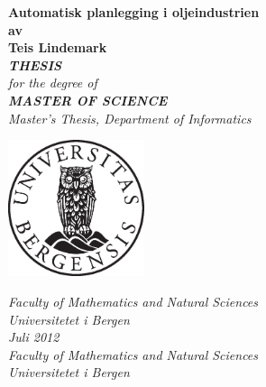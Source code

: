 \documentclass[12pt,twoside,onecolumn]{article}
\begin{document}
\thispagestyle{empty}
\begin{center}        %
  \vspace{5mm}          %
  \LARGE
  \textbf{Automatisk planlegging i oljeindustrien} \\
  \Large
  \vspace{5mm}
  \textbf{av} \\
  \vspace{5mm}
  \large
  \textbf{Teis Lindemark} \\
  \vspace{30mm}
  \Large
  {\bf{\textsl{THESIS}}} \\
  \textsl{for the degree of} \\
  \vspace{2mm}
  {\bf{\textsl{MASTER OF SCIENCE}}} \\
  \vspace{5mm}
  {\large \textsl {Master's Thesis, Department of Informatics}}\\
  \vspace{10mm}
  \centerline{\includegraphics[width=4cm,height=4cm]{uibugle}}
  \vspace{5mm}
  \textsl{Faculty of Mathematics and Natural Sciences} \\
  \textsl{Universitetet i Bergen} \\
  \vspace{10mm}
  \large
  \textsl{Juli 2012} \\
  \vspace{5mm}
  \normalsize
  \textsl{Faculty of Mathematics and Natural Sciences} \\
  \textsl{Universitetet i Bergen} \\
\end{center}
\end{document}

